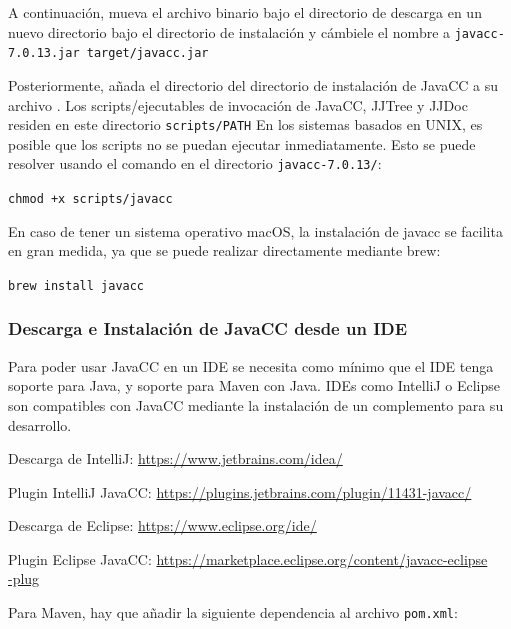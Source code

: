 A continuación, mueva el archivo binario bajo el directorio de descarga en un nuevo directorio bajo el directorio de instalación y cámbiele el nombre a \lstinline|javacc-7.0.13.jar target/javacc.jar|


Posteriormente, añada el directorio del directorio de instalación de JavaCC a su archivo . Los scripts/ejecutables de invocación de JavaCC, JJTree y JJDoc residen en este directorio \lstinline|scripts/PATH|
En los sistemas basados en UNIX, es posible que los scripts no se puedan ejecutar inmediatamente. Esto se puede resolver usando el comando en el directorio \lstinline|javacc-7.0.13/|:

\begin{center}
    \lstinline|chmod +x scripts/javacc|
\end{center}

En caso de tener un sistema operativo macOS, la instalación de javacc se facilita en gran medida, ya que se puede realizar directamente mediante brew:

\begin{center}
    \lstinline|brew install javacc|
\end{center}


\subsubsection{Descarga e Instalación de JavaCC desde un IDE}

\noindent Para poder usar JavaCC en un IDE se necesita como mínimo que el IDE tenga soporte para Java, y soporte para Maven con Java. IDEs como IntelliJ o Eclipse son compatibles con JavaCC mediante la instalación de un complemento para su desarrollo.

Descarga de IntelliJ: \href{https://www.jetbrains.com/idea/}{https://www.jetbrains.com/idea/}

Plugin IntelliJ JavaCC: \href{https://plugins.jetbrains.com/plugin/11431-javacc/}{https://plugins.jetbrains.com/plugin/11431-javacc/}

Descarga de Eclipse: \href{https://www.eclipse.org/ide/}{https://www.eclipse.org/ide/}

Plugin Eclipse JavaCC: \href{https://marketplace.eclipse.org/content/javacc-eclipse-plug}{https://marketplace.eclipse.org/content/javacc-eclipse\\-plug}

Para Maven, hay que añadir la siguiente dependencia al archivo \lstinline|pom.xml|:


\lstset{inputencoding=utf8/latin1}


